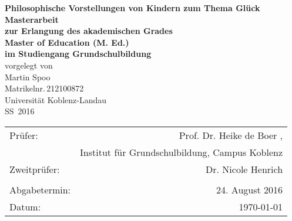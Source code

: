 \begin{titlepage}
	\begin{center}
		\quad
		\vfill
		\Huge{
			 \textbf{Philosophische Vorstellungen von Kindern zum Thema \glqq Glück\grqq}
		}
		\vspace{5mm}
		\vfill
		\large{
			{\bfseries Masterarbeit\\
			\vspace{5mm}
			\normalfont \rmfamily zur Erlangung des akademischen Grades\\
			\bfseries Master of Education (M. Ed.)\\
			\vspace{5mm}
			\normalfont \rmfamily im Studiengang Grundschulbildung}
		}
		\\
		\vspace{1.5cm}
		\large{
			{vorgelegt von\\
			Martin Spoo\\
			Matrikelnr.\,212100872}
		}
		\vspace{1cm}
		\\
		\Large{
			{Universität Koblenz-Landau}\\
			{SS\, 2016}
		}
		\vspace{1cm}
		\begin{table}[b]
			\begin{center}
				\begin{tabular}{lr}
					Prüfer: &  Prof. Dr. Heike de Boer , \\
								&	Institut für Grundschulbildung, Campus Koblenz \\
					Zweitprüfer: & Dr. Nicole Henrich \\
					\vspace{0.25cm} \\
					Abgabetermin: & 24. August 2016 \\
					Datum: & \today
				\end{tabular}
			\end{center}
		\end{table}
	\end{center}
\end{titlepage}
\renewcommand{\baselinestretch}{1.1}
\restoregeometry

